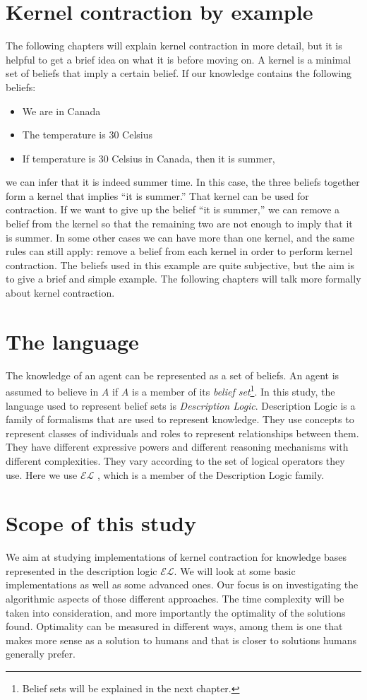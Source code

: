 \section{Kernel contraction by example}
The following chapters will explain kernel contraction in more detail, but it is helpful to get a brief idea on what it is before moving on. A kernel is a minimal set of beliefs that imply a certain belief. If our knowledge contains the following beliefs:
\begin{itemize}
\item We are in Canada
\item The temperature is 30 Celsius
\item If temperature is 30 Celsius in Canada, then it is summer,
\end{itemize}
we can infer that it is indeed summer time. In this case, the three beliefs together form a kernel that implies ``it is summer.'' That kernel can be used for contraction. If we want to give up the belief ``it is summer,'' we can remove a belief from the kernel so that the remaining two are not enough to imply that it is summer. In some other cases we can have more than one kernel, and the same rules can still apply: remove a belief from each kernel in order to perform kernel contraction. The beliefs used in this example are quite subjective, but the aim is to give a brief and simple example. The following chapters will talk more formally about kernel contraction.

\section{The language}
The knowledge of an agent can be represented as a set of beliefs. An agent is assumed to believe in $A$ if $A$ is a member of its \textit{belief set}\footnote{Belief sets will be explained in the next chapter.}. In this study, the language used to represent belief sets is \textit{Description Logic}. Description Logic is a family of formalisms that are used to represent knowledge. They use concepts to represent classes of individuals and roles to represent relationships between them. They have different expressive powers and different reasoning mechanisms with different complexities. They vary according to the set of logical operators they use. Here we use $\mathcal{EL}$ \cite{el}, which is a member of the Description Logic family.

\section{Scope of this study}
We aim at studying implementations of kernel contraction for knowledge bases represented in the description logic $\mathcal{EL}$. We will look at some basic implementations as well as some advanced ones. Our focus is on investigating the algorithmic aspects of those different approaches. The time complexity will be taken into consideration, and more importantly the optimality of the solutions found. Optimality can be measured in different ways, among them is one that makes more sense as a solution to humans and that is closer to solutions humans generally prefer.

